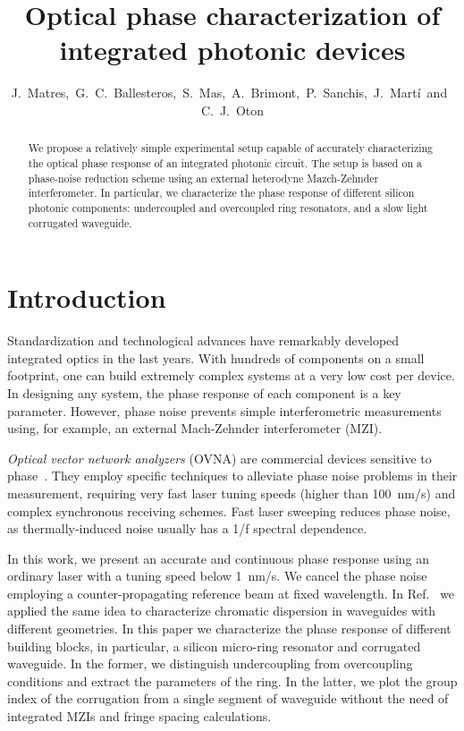 \documentclass[journal]{IEEEtran}
\begin{document}
\title{Optical phase characterization of integrated photonic devices}
\author{J.~Matres,~G.~C.~Ballesteros,~S.~Mas,~A.~Brimont,~P.~Sanchis,~J.~Mart\'i~and~C.~J.~Oton}

\maketitle


\begin{abstract}
We propose a relatively simple experimental setup capable of accurately characterizing the optical phase response of an integrated photonic circuit. The setup is based on a phase-noise reduction scheme using an external heterodyne Mazch-Zehnder interferometer. In particular, we characterize the phase response of different silicon photonic components: undercoupled and overcoupled ring resonators, and a slow light corrugated waveguide.
\end{abstract}

\section{Introduction}
\noindent Standardization and technological advances have remarkably developed integrated optics in the last years.
With hundreds of components on a small footprint, one can build extremely complex systems at a very low cost per device.
In designing any system, the phase response of each component is a key parameter.
However, phase noise prevents simple interferometric measurements using, for example, an external Mach-Zehnder interferometer (MZI).


\emph{Optical vector network analyzers} (OVNA) are commercial devices sensitive to phase~\cite{Vanwiggeren2003, Gifford2005}.
They employ specific techniques to alleviate phase noise problems in their measurement, requiring very fast laser tuning speeds (higher than 100~nm/s) and complex synchronous receiving schemes.
Fast laser sweeping reduces phase noise, as thermally-induced noise usually has a 1/f spectral dependence.


In this work, we present an accurate and continuous phase response using an ordinary laser with a tuning speed below 1~nm/s.
We cancel the phase noise employing a counter-propagating reference beam at fixed wavelength.
In Ref.~\cite{Mas2012} we applied the same idea to characterize chromatic dispersion in waveguides with different geometries.
In this paper we characterize the phase response of different building blocks, in particular, a silicon micro-ring resonator and corrugated waveguide.
In the former, we distinguish undercoupling from overcoupling conditions and extract the parameters of the ring.
In the latter, we plot the group index of the corrugation from a single segment of waveguide without the need of integrated MZIs and fringe spacing calculations.
\end{document}

